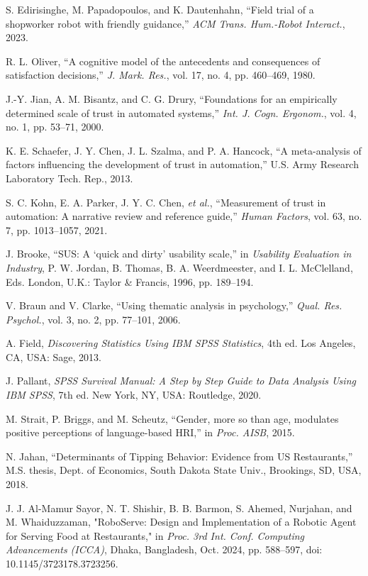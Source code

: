 \documentclass[conference]{IEEEtran}
\begin{document}
\begin{thebibliography}{35}
 S. Edirisinghe, M. Papadopoulos, and K. Dautenhahn, “Field trial of a shopworker robot with friendly guidance,” \textit{ACM Trans. Hum.-Robot Interact.}, 2023.

 R. L. Oliver, “A cognitive model of the antecedents and consequences of satisfaction decisions,” \textit{J. Mark. Res.}, vol. 17, no. 4, pp. 460–469, 1980.

 J.-Y. Jian, A. M. Bisantz, and C. G. Drury, “Foundations for an empirically determined scale of trust in automated systems,” \textit{Int. J. Cogn. Ergonom.}, vol. 4, no. 1, pp. 53–71, 2000.

 K. E. Schaefer, J. Y. Chen, J. L. Szalma, and P. A. Hancock, “A meta-analysis of factors influencing the development of trust in automation,” U.S. Army Research Laboratory Tech. Rep., 2013.

 S. C. Kohn, E. A. Parker, J. Y. C. Chen, \textit{et al.}, “Measurement of trust in automation: A narrative review and reference guide,” \textit{Human Factors}, vol. 63, no. 7, pp. 1013–1057, 2021.

 J. Brooke, “SUS: A ‘quick and dirty’ usability scale,” in \textit{Usability Evaluation in Industry}, P. W. Jordan, B. Thomas, B. A. Weerdmeester, and I. L. McClelland, Eds. London, U.K.: Taylor \& Francis, 1996, pp. 189–194.

 V. Braun and V. Clarke, “Using thematic analysis in psychology,” \textit{Qual. Res. Psychol.}, vol. 3, no. 2, pp. 77–101, 2006.

 A. Field, \textit{Discovering Statistics Using IBM SPSS Statistics}, 4th ed. Los Angeles, CA, USA: Sage, 2013.

 J. Pallant, \textit{SPSS Survival Manual: A Step by Step Guide to Data Analysis Using IBM SPSS}, 7th ed. New York, NY, USA: Routledge, 2020.

 M. Strait, P. Briggs, and M. Scheutz, “Gender, more so than age, modulates positive perceptions of language-based HRI,” in \textit{Proc. AISB}, 2015.

 N. Jahan, “Determinants of Tipping Behavior: Evidence from US Restaurants,” M.S. thesis, Dept. of Economics, South Dakota State Univ., Brookings, SD, USA, 2018.



 J. J. Al-Mamur Sayor, N. T. Shishir, B. B. Barmon, S. Ahemed, Nurjahan, and M. Whaiduzzaman, "RoboServe: Design and Implementation of a Robotic Agent for Serving Food at Restaurants," in \textit{Proc. 3rd Int. Conf. Computing Advancements (ICCA)}, Dhaka, Bangladesh, Oct. 2024, pp. 588–597, doi: 10.1145/3723178.3723256.


\end{thebibliography}
\end{document}
